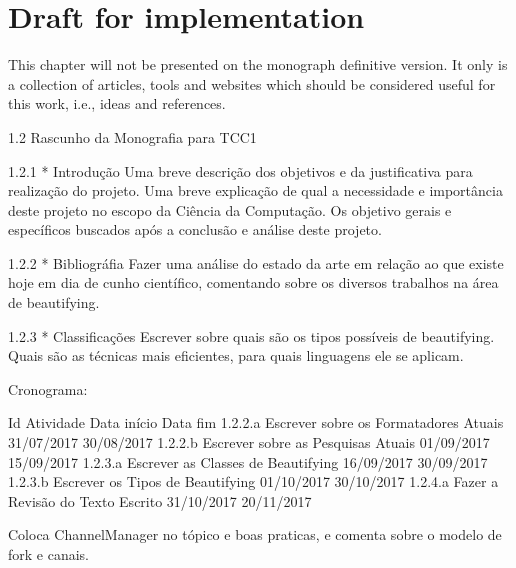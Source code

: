 
%


\chapter{Draft for implementation}

This chapter will not be presented on the monograph definitive version.
It only is a collection of articles,
tools and websites which should be considered useful for this work, i.e., ideas and references.

1.2      Rascunho da Monografia para TCC1

1.2.1    * Introdução       Uma breve descrição dos objetivos e da
           justificativa para realização do projeto. Uma breve explicação de
           qual a necessidade e importância deste projeto no escopo da
           Ciência da Computação. Os objetivo gerais e específicos buscados
           após a conclusão e análise deste projeto.

1.2.2    * Bibliográfia     Fazer uma análise do estado da arte em relação
         ao que existe hoje em dia de cunho científico, comentando sobre os
         diversos trabalhos na área de beautifying.

1.2.3    * Classificações   Escrever sobre quais são os tipos possíveis de
         beautifying. Quais são as técnicas mais eficientes, para quais
         linguagens ele se aplicam.

Cronograma:

Id      Atividade                               Data início    Data fim
1.2.2.a Escrever sobre os Formatadores Atuais   31/07/2017     30/08/2017
1.2.2.b Escrever sobre as Pesquisas Atuais      01/09/2017     15/09/2017
1.2.3.a Escrever as Classes de Beautifying      16/09/2017     30/09/2017
1.2.3.b Escrever os Tipos de Beautifying        01/10/2017     30/10/2017
1.2.4.a Fazer a Revisão do Texto Escrito        31/10/2017     20/11/2017

Coloca ChannelManager no tópico e boas praticas, e comenta sobre o modelo de
fork e canais.

